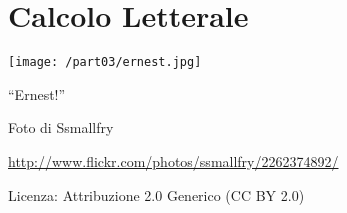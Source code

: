 \part{Calcolo Letterale}
\texttt{[image: /part03/ernest.jpg]}
  \begin{center}
    {\large ``Ernest!''}\par
    Foto di Ssmallfry\par
    \url{http://www.flickr.com/photos/ssmallfry/2262374892/}\par
    Licenza: Attribuzione 2.0 Generico (CC BY 2.0)\par
  \end{center}
\clearpage
\cleardoublepage
